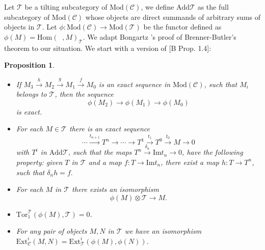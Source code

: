 \documentclass{amsart}
\theoremstyle{plain}
\newtheorem{proposition}{Proposition}
\numberwithin{equation}{section}
\begin{document}
Let $\mathcal{T}$ be a tilting subcategory of $\mathrm{\mathrm{Mod}}(\mathcal{C})$, we define $\mathrm{Add}\mathcal{T}$ as the full subcategory
of $\mathrm{\mathrm{Mod}}(\mathcal{C})$ whose objects are direct summands of
arbitrary sums of objects in $\mathcal{T}$. Let $\phi :\mathrm{\mathrm{Mod}}(\mathcal{C})\rightarrow \mathrm{\mathrm{Mod}}(\mathcal{T})$ be the functor
defined as $\phi (M)=\mathrm{Hom}(\;\;,M)_{\mathcal{T}}$. We adapt Bongartz
's proof of Brenner-Butler's theorem to our situation. We start with a
version of [B Prop. 1.4]:

\begin{proposition}
\label{TORZ}

\begin{itemize}
\item[(i)] If $M_{3}\xrightarrow{h}M_{2}\xrightarrow{g}M_{1}\xrightarrow{f}M_{0}$ is an exact sequence in $\mathrm{\mathrm{Mod}}(\mathcal{C})$, such
that $M_{i}$ belongs to $\mathscr T$, then the sequence\begin{equation*}
\phi (M_{2})\rightarrow \phi (M_{1})\rightarrow \phi (M_{0})
\end{equation*}is exact.

\item[(ii)] For each $M\in \mathscr T$ there is an exact sequence
\begin{equation*}
\cdots \xrightarrow{t_{n+1}}T^{n}\rightarrow \cdots \rightarrow T^{1}\xrightarrow{t_1}T^{0}\xrightarrow{t_0}M\rightarrow 0
\end{equation*}with $T^{i}$ in $\mathrm{Add}\mathcal{T}$, such that the maps $T^{n}\overset{\delta_{n}}{\rightarrow }\mathrm{Im}t_{n}\rightarrow 0$, have the following
property: given $T$ in $\mathcal{T}$ and a map $f:T\rightarrow \mathrm{Im}t
_{n}$, there exist a map $h:T\rightarrow T^{n}$, such that $\delta_{n}h=f.$

\item[(iii)] For each $M$ in $\mathscr{T}$ there exists an isomorphism
\begin{equation*}
\phi (M)\otimes \mathcal{T}\rightarrow M\text{.}
\end{equation*}

\item[(iv)] $\mathrm{Tor}_{1}^{\mathcal{T}}(\phi (M),\mathcal{T})=0$.

\item[(v)] For any pair of objects $M,N$ in $\mathscr{T}$ we have an
isomorphism $\mathrm{Ext}_{\mathcal{C}}^{i}(M,N)=\mathrm{Ext}_{\mathcal{T}}^{i}(\phi (M),\phi (N))$.
\end{itemize}
\end{proposition}
\end{document}
